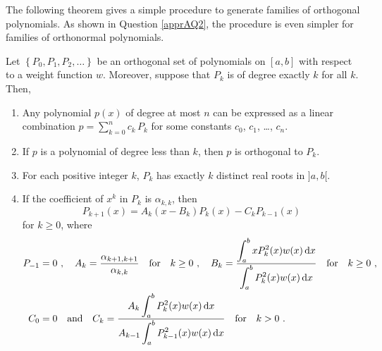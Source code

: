 The following theorem gives a simple procedure to generate families of
orthogonal polynomials.  As shown in Question \ref{apprAQ2}, the
procedure is even simpler for families of orthonormal polynomials.

\begin{theorem}
Let $\left\{ P_0,P_1,P_2,\ldots \right\}$ be an orthogonal set of
polynomials on $[a,b]$ with respect to a weight function $w$.
Moreover, suppose that $P_k$ is of degree exactly $k$ for all $k$.  Then,
\begin{enumerate}
\item Any polynomial $p(x)$ of degree at most $n$ can be expressed as
a linear combination $\displaystyle p=\sum_{k=0}^n c_k\,P_k$
for some constants $c_0$, $c_1$, \ldots, $c_n$.
\item If $p$ is a polynomial of degree less than $k$, then $p$ is
orthogonal to $P_k$.
\item For each positive integer $k$, $P_k$ has exactly $k$
distinct real roots in $]a,b[$.
\item If the coefficient of $x^k$ in $P_k$ is $\alpha_{k,k}$, then
\[
P_{k+1}(x) = A_k(x-B_k)P_k(x) - C_k P_{k-1}(x)
\]
for $k \geq 0$, where
\begin{align*}
P_{-1} &= 0 \ , \quad
A_k = \frac{\alpha_{k+1,k+1}}{\alpha_{k,k}} \quad \text{for} \quad k \geq 0 \ ,
\quad B_k = \frac{\displaystyle \int_a^b xP_k^2(x)w(x) \,\mathrm{d}x}
{\displaystyle \int_a^b P_k^2(x)w(x)\,\mathrm{d}x} \quad \text{for}
\quad k\geq 0 \ , \\
C_0 &= 0 \quad \text{and} \quad
C_k = \frac{\displaystyle A_k\int_a^b P_k^2(x)w(x) \,\mathrm{d}x}
{\displaystyle A_{k-1} \int_a^b P_{k-1}^2(x)w(x) \,\mathrm{d}x}
\quad \text{for} \quad  k>0 \ .
\end{align*}
\end{enumerate}
\label{orthpoly}
\end{theorem}

